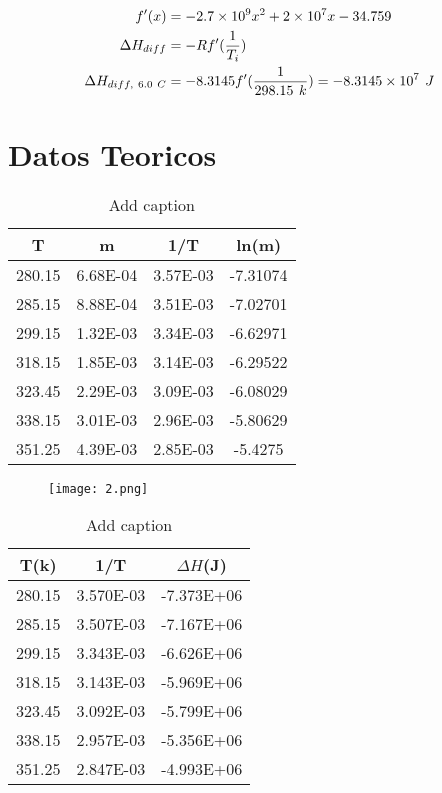 \documentclass[a4paper,12pt]{article}
\begin{document}
\begin{align*}
	f'(x) &= -2.7 \times 10^9 x^2 + 2 \times 10^7 x - 34.759\\
	\Delta H_{diff} &= -Rf'(\frac{1}{T_i})\\
	\Delta H_{diff,\ 6.0\ C} &= -8.3145f'\large(\frac{1}{298.15\ k}\large) = -8.3145 \times 10^7\ J
\end{align*}



\section{Datos Teoricos}

\begin{table}[htbp]
  \centering
  \caption{Add caption}
    \begin{tabular}{|c|c|c|c|}
    \hline
    \multicolumn{1}{|c|}{T} & m     & 1/T   & ln(m) \bigstrut\\
    \hline
    280.15 & 6.68E-04 & 3.57E-03 & -7.31074 \bigstrut[t]\\
    285.15 & 8.88E-04 & 3.51E-03 & -7.02701 \\
    299.15 & 1.32E-03 & 3.34E-03 & -6.62971 \\
    318.15 & 1.85E-03 & 3.14E-03 & -6.29522 \\
    323.45 & 2.29E-03 & 3.09E-03 & -6.08029 \\
    338.15 & 3.01E-03 & 2.96E-03 & -5.80629 \\
    351.25 & 4.39E-03 & 2.85E-03 & -5.4275 \bigstrut[b]\\
    \hline
    \end{tabular}%
  \label{tab:addlabel}%
\end{table}%

\begin{figure}
	\centering
	\texttt{[image: 2.png]}
\end{figure}


\begin{table}[htbp]
  \centering
  \caption{Add caption}
    \begin{tabular}{|r|c|c|}
    \hline
    \multicolumn{1}{|c|}{T(k)} & 1/T   & $\Delta H$(J) \bigstrut\\
    \hline
    280.15 & 3.570E-03 & -7.373E+06 \bigstrut[t]\\
    285.15 & 3.507E-03 & -7.167E+06 \\
    299.15 & 3.343E-03 & -6.626E+06 \\
    318.15 & 3.143E-03 & -5.969E+06 \\
    323.45 & 3.092E-03 & -5.799E+06 \\
    338.15 & 2.957E-03 & -5.356E+06 \\
    351.25 & 2.847E-03 & -4.993E+06 \bigstrut[b]\\
    \hline
    \end{tabular}%
  \label{tab:addlabel}%
\end{table}%
\end{document}
